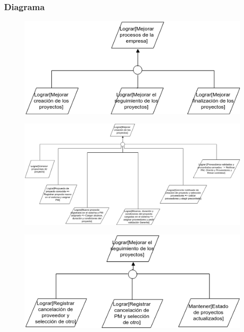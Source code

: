 \subsubsection{Diagrama}

\begin{figure}[H]
    \centering
    \includegraphics[width=\textwidth]{imagenes/objetivos-principales.png}
\end{figure}

\vspace{1em}

\begin{figure}[H]
    \centering
    \includegraphics[width=\textwidth, keepaspectratio, angle=90]{imagenes/objetivos-creacion.png}
\end{figure}

\vspace{1em}

\begin{figure}[H]
    \centering
    \includegraphics[width=\textwidth]{imagenes/objetivos-seguimiento.png}
\end{figure}

